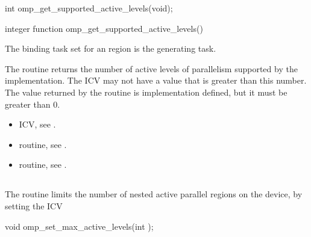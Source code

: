 \format
\begin{ccppspecific}
\begin{ompcFunction}
int omp_get_supported_active_levels(void);
\end{ompcFunction}
\end{ccppspecific}

\begin{fortranspecific}
\begin{ompfFunction}
integer function omp_get_supported_active_levels()
\end{ompfFunction}
\end{fortranspecific}

\binding
The binding task set for an 
region is the generating task.

\effect
The  routine returns the
number of active levels of parallelism supported by the implementation. The
 ICV may not have a value that is greater than
this number. The value returned by the 
routine is implementation defined, but it must be greater than 0.

\crossreferences
\begin{itemize}
\item {} ICV, see
.

\item {} routine, see
.

\item {} routine, see
.
\end{itemize}



\subsection{}
\label{subsec:omp_set_max_active_levels}
\summary
The  routine limits the number of nested active
parallel regions on the device, by setting the  ICV

\format
\begin{ccppspecific}
\begin{ompcFunction}
void omp_set_max_active_levels(int );
\end{ompcFunction}
\end{ccppspecific}

